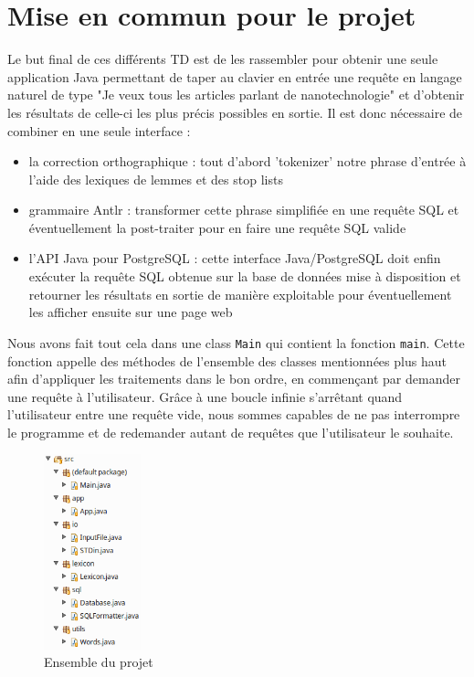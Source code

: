 \chapter{Mise en commun pour le projet}

Le but final de ces différents TD est de les rassembler pour obtenir une seule application Java permettant de taper au clavier en entrée une requête en langage naturel de type "Je veux tous les articles parlant de nanotechnologie" et d'obtenir les résultats de celle-ci les plus précis possibles en sortie.
Il est donc nécessaire de combiner en une seule interface :
\begin{itemize}
  \item la correction orthographique : tout d'abord 'tokenizer' notre phrase d'entrée à l'aide des lexiques de lemmes et des stop lists
  \item grammaire Antlr : transformer cette phrase simplifiée en une requête SQL et éventuellement la post-traiter pour en faire une requête SQL valide
  \item l'API Java pour PostgreSQL : cette interface Java/PostgreSQL doit enfin exécuter la requête SQL obtenue sur la base de données mise à disposition et retourner les résultats en sortie de manière exploitable pour éventuellement les afficher ensuite sur une page web
\end{itemize}

\java
Nous avons fait tout cela dans une class \lstinline{Main} qui contient la fonction \lstinline{main}. Cette fonction appelle des méthodes de l'ensemble des classes mentionnées plus haut afin d'appliquer les traitements dans le bon ordre, en commençant par demander une requête à l'utilisateur. Grâce à une boucle infinie s'arrêtant quand l'utilisateur entre une requête vide, nous sommes capables de ne pas interrompre le programme et de redemander autant de requêtes que l'utilisateur le souhaite.

\begin{figure}[H]
    \centering\includegraphics[width=0.25\textwidth]{images/projet.png}
    \caption{Ensemble du projet}
\end{figure}

